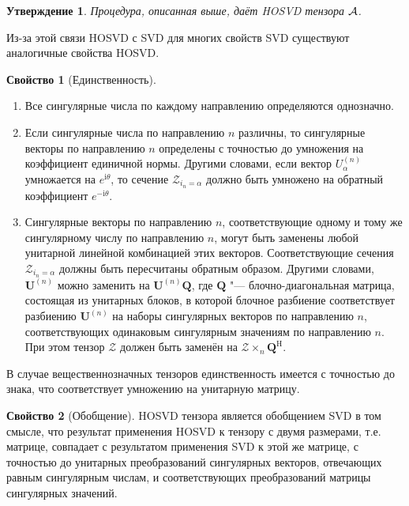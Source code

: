 \documentclass[specialist,
  substylefile=spbu_report.rtx,
subf,href,colorlinks=true, 12pt]{disser}
\theoremstyle{plain}
\newtheorem{statement}{Утверждение}[section]
\theoremstyle{definition}
\newtheorem{property}{Свойство}[section]
\theoremstyle{remark}
\newcommand{\iu}{\mathrm{i}}
\begin{document}
\begin{statement}
  Процедура, описанная выше, даёт HOSVD тензора $\mathcal{A}$.
  \label{state:hosvd-to-svd}
\end{statement}

Из-за этой связи HOSVD с SVD для многих свойств SVD существуют
аналогичные свойства HOSVD\@.
\begin{property}[Единственность]
  \leavevmode
  \begin{enumerate}
    \item Все сингулярные числа по каждому направлению определяются
      однозначно.
    \item Если сингулярные числа по направлению $n$ различны, то
      сингулярные векторы по направлению $n$ определены
      с точностью до умножения на коэффициент единичной нормы.
      Другими словами, если вектор $U_\alpha^{(n)}$ умножается на
      $e^{\iu\theta}$, то
      сечение $\mathcal{Z}_{i_n=\alpha}$ должно быть умножено на обратный
      коэффициент $e^{-\iu\theta}$.
    \item Сингулярные векторы по направлению $n$, соответствующие
      одному и тому же сингулярному числу по направлению $n$, могут
      быть заменены любой унитарной линейной комбинацией этих векторов.
      Соответствующие сечения $\mathcal{Z}_{i_n=\alpha}$ должны быть
      пересчитаны обратным образом.
      Другими словами, $\mathbf{U}^{(n)}$ можно заменить на
      $\mathbf{U}^{(n)}\mathbf{Q}$,
      где $\mathbf{Q}$ "--- блочно-диагональная матрица, состоящая из
      унитарных блоков, в которой блочное
      разбиение соответствует разбиению $\mathbf{U}^{(n)}$
      на наборы сингулярных векторов по направлению $n$,
      соответствующих одинаковым сингулярным значениям
      по направлению $n$.
      При этом тензор $\mathcal{Z}$ должен быть заменён на
      $\mathcal{Z}\times_{n} \mathbf{Q}^{\mathrm{H}}$.
  \end{enumerate}
  В случае вещественнозначных тензоров единственность имеется с
  точностью до знака, что соответствует
  умножению на унитарную матрицу.
\end{property}

\begin{property}[Обобщение]
  HOSVD тензора является обобщением SVD в том смысле, что
  результат применения HOSVD к тензору с двумя размерами, т.е.
  матрице, совпадает
  с результатом применения SVD к этой же матрице, с точностью до
  унитарных преобразований сингулярных векторов,
  отвечающих равным сингулярным числам, и соответствующих преобразований
  матрицы сингулярных значений.
\end{property}
\end{document}
